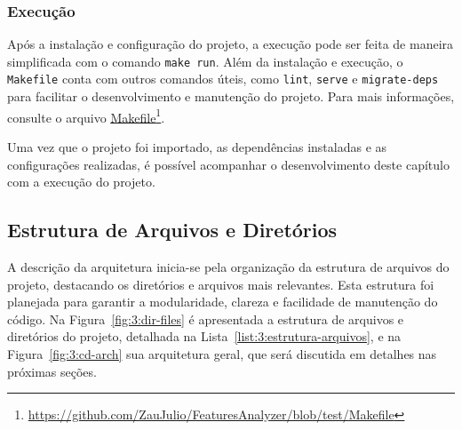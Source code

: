 \subsubsection{Execução}
\label{subsec:3:execucao}

\newcommand\urlMakefile{https://github.com/ZauJulio/FeaturesAnalyzer/blob/test/Makefile}

Após a instalação e configuração do projeto, a execução pode ser feita de maneira simplificada com o comando \verb|make run|. Além da instalação e execução, o \texttt{Makefile} conta com outros comandos úteis, como \texttt{lint}, \texttt{serve} e \texttt{migrate-deps} para facilitar o desenvolvimento e manutenção do projeto. Para mais informações, consulte o arquivo \href{\urlMakefile}{\underline{Makefile}}\footnote{\url{\urlMakefile}}.

Uma vez que o projeto foi importado, as dependências instaladas e as configurações realizadas, é possível acompanhar o desenvolvimento deste capítulo com a execução do projeto.

\subsection{Estrutura de Arquivos e Diretórios}
\label{subsec:3:estrutura-arquivos}

A descrição da arquitetura inicia-se pela organização da estrutura de arquivos do projeto, destacando os diretórios e arquivos mais relevantes. Esta estrutura foi planejada para garantir a modularidade, clareza e facilidade de manutenção do código. Na Figura~\ref{fig:3:dir-files} é apresentada a estrutura de arquivos e diretórios do projeto, detalhada na Lista~\ref{list:3:estrutura-arquivos}, e na Figura~\ref{fig:3:cd-arch} sua arquitetura geral, que será discutida em detalhes nas próximas seções.

\renewcommand*\DTstylecomment{\rmfamily\small\color{gray}\textsc}

